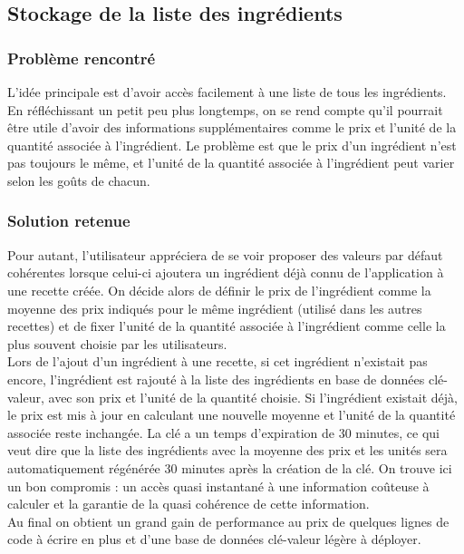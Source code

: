 	\subsection{Stockage de la liste des ingrédients}
		\subsubsection{Problème rencontré}
			L'idée principale est d'avoir accès facilement à une liste de tous les ingrédients. En réfléchissant un petit peu plus longtemps, on se rend compte qu'il pourrait être utile d'avoir des informations supplémentaires comme le prix et l'unité de la quantité associée à l'ingrédient. Le problème est que le prix d'un ingrédient n'est pas toujours le même, et l'unité de la quantité associée à l'ingrédient peut varier selon les goûts de chacun.\\

		\subsubsection{Solution retenue}
			Pour autant, l'utilisateur appréciera de se voir proposer des valeurs par défaut cohérentes lorsque celui-ci ajoutera un ingrédient déjà connu de l'application à une recette créée. On décide alors de définir le prix de l'ingrédient comme la moyenne des prix indiqués pour le même ingrédient (utilisé dans les autres recettes) et de fixer l'unité de la quantité associée à l'ingrédient comme celle la plus souvent choisie par les utilisateurs.\\

			Lors de l'ajout d'un ingrédient à une recette, si cet ingrédient n'existait pas encore, l'ingrédient est rajouté à la liste des ingrédients en base de données clé-valeur, avec son prix et l'unité de la quantité choisie. Si l'ingrédient existait déjà, le prix est mis à jour en calculant une nouvelle moyenne et l'unité de la quantité associée reste inchangée. La clé a un temps d'expiration de 30 minutes, ce qui veut dire que la liste des ingrédients avec la moyenne des prix et les unités sera automatiquement régénérée 30 minutes après la création de la clé. On trouve ici un bon compromis : un accès quasi instantané à une information coûteuse à calculer et la garantie de la quasi cohérence de cette information.\\

			Au final on obtient un grand gain de performance au prix de quelques lignes de code à écrire en plus et d'une base de données clé-valeur légère à déployer.
